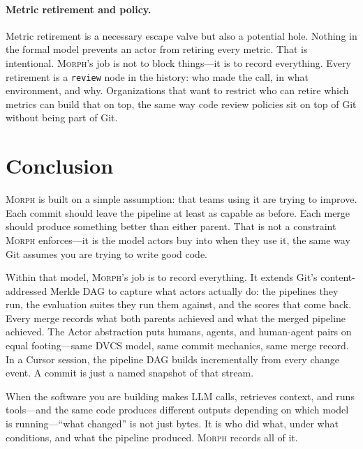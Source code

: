 \documentclass{article}
\begin{document}
\paragraph{Metric retirement and policy.}
Metric retirement is a necessary escape valve but also a potential hole.
Nothing in the formal model prevents an actor from retiring every metric.
That is intentional. \textsc{Morph}'s job is not to block things---it is to
record everything. Every retirement is a \texttt{review} node in the history:
who made the call, in what environment, and why. Organizations that want to
restrict who can retire which metrics can build that on top, the same way
code review policies sit on top of Git without being part of Git.

\section{Conclusion}
\label{sec:conclusion}

\textsc{Morph} is built on a simple assumption: that teams using it are trying
to improve. Each commit should leave the pipeline at least as capable as before.
Each merge should produce something better than either parent. That is not a
constraint \textsc{Morph} enforces---it is the model actors buy into when they
use it, the same way Git assumes you are trying to write good code.

Within that model, \textsc{Morph}'s job is to record everything. It extends
Git's content-addressed Merkle DAG to capture what actors actually do: the
pipelines they run, the evaluation suites they run them against, and the scores
that come back. Every merge records what both parents achieved and what the
merged pipeline achieved. The Actor abstraction puts humans, agents, and
human-agent pairs on equal footing---same DVCS model, same commit mechanics,
same merge record. In a Cursor session, the pipeline DAG builds incrementally
from every change event. A commit is just a named snapshot of that stream.

When the software you are building makes LLM calls, retrieves context, and
runs tools---and the same code produces different outputs depending on which
model is running---``what changed'' is not just bytes. It is who did what,
under what conditions, and what the pipeline produced. \textsc{Morph} records
all of it.


\end{document}
